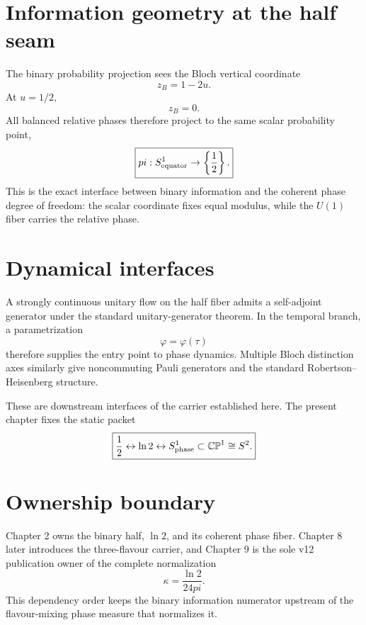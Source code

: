 \documentclass[11pt,a4paper,twoside]{book}
\def\pi{pi}%
\theoremstyle{definition}
\begin{document}
\section{Information geometry at the half seam}

The binary probability projection sees the Bloch vertical coordinate
\begin{equation}
z_B=1-2u.
\end{equation}
At $u=1/2$,
\begin{equation}
z_B=0.
\end{equation}
All balanced relative phases therefore project to the same scalar probability point,
\begin{equation}
\boxed{
\pi:S^1_{\rm equator}\to\left\{\frac12\right\}.
}
\end{equation}
This is the exact interface between binary information and the coherent phase degree of freedom: the scalar coordinate fixes equal modulus, while the $U(1)$ fiber carries the relative phase.

\section{Dynamical interfaces}

A strongly continuous unitary flow on the half fiber admits a self-adjoint generator under the standard unitary-generator theorem. In the temporal branch, a parametrization
\begin{equation}
\varphi=\varphi(\tau)
\end{equation}
therefore supplies the entry point to phase dynamics. Multiple Bloch distinction axes similarly give noncommuting Pauli generators and the standard Robertson--Heisenberg structure.

These are downstream interfaces of the carrier established here. The present chapter fixes the static packet
\begin{equation}
\boxed{
\frac12
\leftrightarrow
\ln2
\leftrightarrow
S^1_{\rm phase}
\subset
\mathbb{CP}^1\cong S^2.
}
\end{equation}

\section{Ownership boundary}

Chapter 2 owns the binary half, $\ln2$, and its coherent phase fiber. Chapter 8 later introduces the three-flavour carrier, and Chapter 9 is the sole v12 publication owner of the complete normalization
\[
\kappa=\frac{\ln2}{24\pi}.
\]
This dependency order keeps the binary information numerator upstream of the flavour-mixing phase measure that normalizes it.
\end{document}
